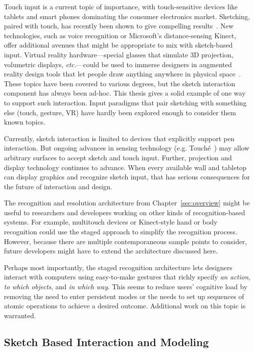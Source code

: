 Touch input is a current topic of importance, with touch-sensitive
devices like tablets and smart phones dominating the consumer
electronics market. Sketching, paired with touch, has recently been
shown to give compelling results~\cite{hinckley-pen-touch}. New
technologies, such as voice recognition or Microsoft's
distance-sensing Kinect, offer additional avenues that might be
appropriate to mix with sketch-based input. Virtual reality
hardware---special glasses that simulate 3D projection, volumetric
displays, \textit{etc.}---could be used to immerse designers in
augmented reality design tools that let people draw anything anywhere
in physical space~\cite{jung-lightpen}. These topics have been covered
to various degrees, but the sketch interaction component has always
been ad-hoc. This thesis gives a solid example of one way to support
such interaction. Input paradigms that pair sketching with something
else (touch, gesture, VR) have hardly been explored enough to consider
them known topics. 

Currently, sketch interaction is limited to devices that explicitly
support pen interaction. But ongoing advances in sensing technology
(e.g. Touch\'e~\cite{sato-touche}) may allow arbitrary surfaces to
accept sketch and touch input. Further, projection and display
technology continues to advance. When every available wall and
tabletop can display graphics and recognize sketch input, that has
serious consequences for the future of interaction and design.

The recognition and resolution architecture from
Chapter~\ref{sec:overview} might be useful to researchers and
developers working on other kinds of recognition-based systems. For
example, multitouch devices or Kinect-style hand or body recognition
could use the staged approach to simplify the recognition
process. However, because there are multiple contemporaneous sample
points to consider, future developers might have to extend the
architecture discussed here.

Perhaps most importantly, the staged recognition architecture lets
designers interact with computers using easy-to-make gestures that
richly specify \textit{an action}, \textit{to which objects}, and
\textit{in which way}. This seems to reduce users' cognitive load by
removing the need to enter persistent modes or the needs to set up
sequences of atomic operations to achieve a desired
outcome. Additional work on this topic is warranted.

\subsection{Sketch Based Interaction and Modeling}

